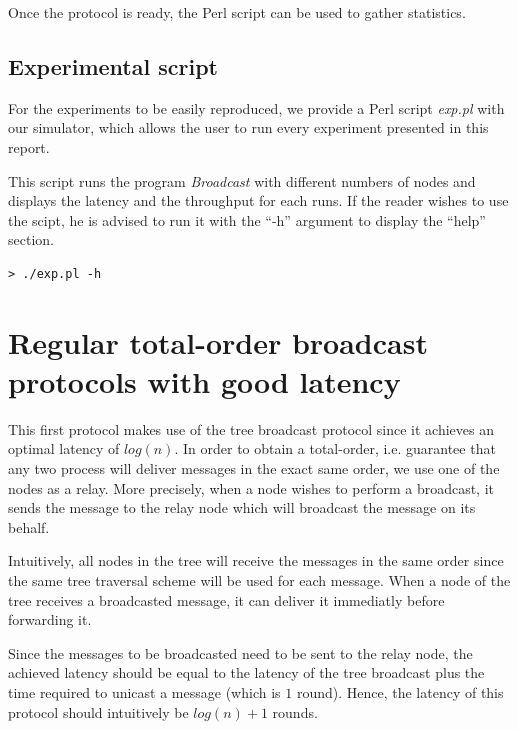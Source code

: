 \documentclass[a4paper]{article}
\begin{document}
Once the protocol is ready, the Perl script can be used to gather statistics.

\subsection{Experimental script}
For the experiments to be easily reproduced, we provide a Perl script
\textit{exp.pl} with our simulator, which allows the user to run every
experiment presented in this report.

This script runs the program \textit{Broadcast} with different numbers of
nodes and displays the latency and the throughput for each runs. If the reader
wishes to use the scipt, he is advised to run it with the ``-h'' argument to
display the ``help'' section.

\begin{lstlisting}
> ./exp.pl -h
\end{lstlisting}

\section{Regular total-order broadcast protocols with good latency}
\label{sec:latencyTO}

This first protocol makes use of the tree broadcast protocol since it achieves
an optimal latency of $log(n)$. In order to obtain a total-order, i.e.
guarantee that any two process will deliver messages in the exact same order,
we use one of the nodes as a relay. More precisely, when a node wishes to
perform a broadcast, it sends the message to the relay node which will
broadcast the message on its behalf.

Intuitively, all nodes in the tree will receive the messages in the same order
since the same tree traversal scheme will be used for each message. When a
node of the tree receives a broadcasted message, it can deliver it immediatly
before forwarding it.

Since the messages to be broadcasted need to be sent to the relay node, the
achieved latency should be equal to the latency of the tree broadcast plus
the time required to unicast a message (which is $1$ round). Hence, the
latency of this protocol should intuitively be $log(n) + 1$ rounds.
\end{document}
